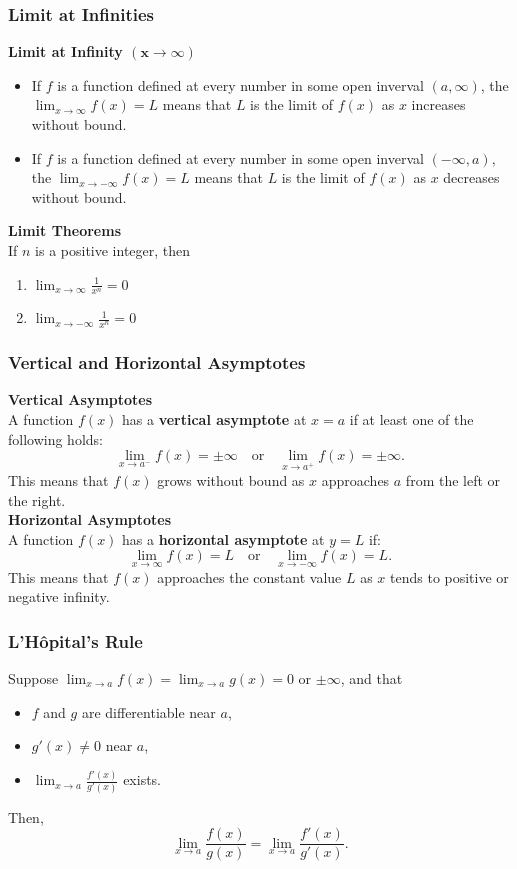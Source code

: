 \documentclass[11pt]{article}
\begin{document}
\subsubsection{Limit at Infinities}
\textbf{Limit at Infinity $\boldsymbol{(x\to\infty)}$}
\begin{itemize}
    \item If $f$ is a function defined at every number in some open inverval $(a,\infty)$,
        the $\displaystyle\lim_{x\to\infty}f(x)=L$ means that $L$ is the limit of $f(x)$ 
        as $x$ increases without bound.
    \item If $f$ is a function defined at every number in some open inverval $(-\infty, a)$,
        the $\displaystyle\lim_{x\to-\infty}f(x)=L$ means that $L$ is the limit of $f(x)$ 
        as $x$ decreases without bound.
\end{itemize}
\textbf{Limit Theorems}\\
If $n$ is a positive integer, then
\begin{enumerate}[label=(\alph*)]
    \item $
        \displaystyle 
        \lim_{x\to\infty}\frac{1}{x^n}=0
    $
    \item $
        \displaystyle 
        \lim_{x\to-\infty}\frac{1}{x^n}=0
    $
\end{enumerate}
\subsubsection{Vertical and Horizontal Asymptotes}
\textbf{Vertical Asymptotes}\\
A function $f(x)$ has a \textbf{vertical asymptote} at $x = a$ if at least one of the following holds:
\[
    \lim_{x \to a^-} f(x) = \pm\infty \quad \text{or} \quad \lim_{x \to a^+} f(x) = \pm\infty.
\]
\noindent
This means that $f(x)$ grows without bound as $x$ approaches $a$ from the left or the right.\\[.5em]
\textbf{Horizontal Asymptotes}\\
A function $f(x)$ has a \textbf{horizontal asymptote} at $y = L$ if:
\[
    \lim_{x \to \infty} f(x) = L \quad \text{or} \quad \lim_{x \to -\infty} f(x) = L.
\]
\noindent
This means that $f(x)$ approaches the constant value $L$ as $x$ tends to positive or negative infinity.
\subsubsection{L'Hôpital's Rule}
Suppose $\displaystyle\lim_{x \to a} f(x) = \lim_{x \to a} g(x) = 0$ or $\pm \infty$, and that
\begin{itemize}
    \item $f$ and $g$ are differentiable near $a$,
    \item $g'(x) \neq 0$ near $a$,
    \item $\displaystyle \lim_{x \to a} \frac{f'(x)}{g'(x)}$ exists.
\end{itemize}
Then,
\[
    \lim_{x \to a} \frac{f(x)}{g(x)} = \lim_{x \to a} \frac{f'(x)}{g'(x)}.
\]
\end{document}
